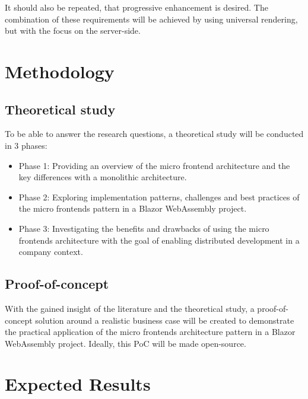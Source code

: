 It should also be repeated, that progressive enhancement is desired. The
combination of these requirements will be achieved by using universal rendering,
but with the focus on the server-side.





\section{Methodology}
\label{sec:methodology}

\subsection{Theoretical study}
To be able to answer the research questions, a theoretical study will be
conducted in 3 phases:
\begin{itemize}
    \item Phase 1: Providing an overview of the micro frontend architecture and
    the key differences with a monolithic architecture.
    \item Phase 2: Exploring implementation patterns, challenges and best
    practices of the micro frontends pattern in a Blazor WebAssembly project.
    \item Phase 3: Investigating the benefits and drawbacks of using the micro
    frontends architecture with the goal of enabling distributed development in
    a company context.
\end{itemize}

\subsection{Proof-of-concept}
With the gained insight of the literature and the theoretical study, a
proof-of-concept solution around a realistic business case will be created to
demonstrate the practical application of the micro frontends architecture
pattern in a Blazor WebAssembly project. Ideally, this PoC will be made
open-source.




\section{Expected Results}
\label{sec:expected-results}

